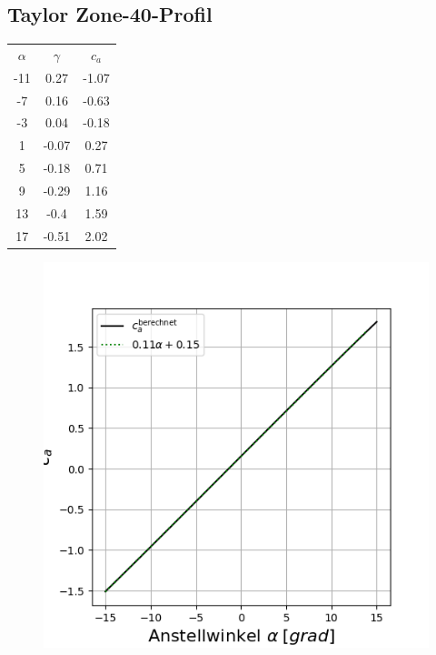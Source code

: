 \subsection{Taylor Zone-40-Profil}

\begin{minipage}{0.45\textwidth}
\begin{table}[H]
    \centering
    \begin{tabular}{c|cc}
    $\alpha$ & $\gamma$ & $c_a$ \\
        -11 & 0.27 & -1.07 \\ 
-7 & 0.16 & -0.63 \\ 
-3 & 0.04 & -0.18 \\ 
1 & -0.07 & 0.27 \\ 
5 & -0.18 & 0.71 \\ 
9 & -0.29 & 1.16 \\ 
13 & -0.4 & 1.59 \\ 
17 & -0.51 & 2.02 \\ 


    \end{tabular}
    \label{tab:zone}
\end{table}
\end{minipage}
\hfill
\begin{minipage}{0.45\textwidth}
\begin{figure}[H]
    \centering
    \includegraphics[scale=0.4]{figures/zoneca.png}
    \label{fig:zoneca}
\end{figure}
\end{minipage}

